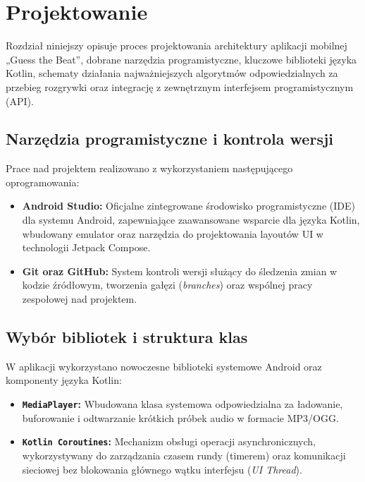\section{Projektowanie}		%

\hspace{0.60cm}Rozdział niniejszy opisuje proces projektowania architektury aplikacji mobilnej „Guess the Beat”, dobrane narzędzia programistyczne, kluczowe biblioteki języka Kotlin, schematy działania najważniejszych algorytmów odpowiedzialnych za przebieg rozgrywki oraz integrację z zewnętrznym interfejsem programistycznym (API).

\subsection{Narzędzia programistyczne i kontrola wersji}

\hspace{0.60cm}Prace nad projektem realizowano z wykorzystaniem następującego oprogramowania:
\begin{itemize}
    \item \textbf{Android Studio:} Oficjalne zintegrowane środowisko programistyczne (IDE) dla systemu Android, zapewniające zaawansowane wsparcie dla języka Kotlin, wbudowany emulator oraz narzędzia do projektowania layoutów UI w technologii Jetpack Compose.
    \item \textbf{Git oraz GitHub:} System kontroli wersji służący do śledzenia zmian w kodzie źródłowym, tworzenia gałęzi (\textit{branches}) oraz wspólnej pracy zespołowej nad projektem.
\end{itemize}

\subsection{Wybór bibliotek i struktura klas}

\hspace{0.60cm}W aplikacji wykorzystano nowoczesne biblioteki systemowe Android oraz komponenty języka Kotlin:
\begin{itemize}
    \item \textbf{\texttt{MediaPlayer}:} Wbudowana klasa systemowa odpowiedzialna za ładowanie, buforowanie i odtwarzanie krótkich próbek audio w formacie MP3/OGG.
    \item \textbf{\texttt{Kotlin Coroutines}:} Mechanizm obsługi operacji asynchronicznych, wykorzystywany do zarządzania czasem rundy (timerem) oraz komunikacji sieciowej bez blokowania głównego wątku interfejsu (\textit{UI Thread}).
\end{itemize}

